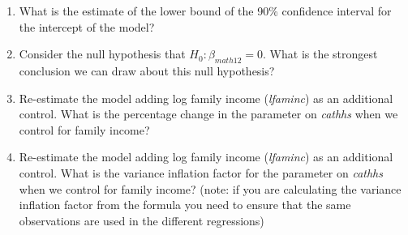 \begin{enumerate}
\item What is the estimate of the lower bound of the 90\% confidence interval for the intercept of the model?

\item Consider the null hypothesis that $H_0:\beta_{math12}=0$. What is the strongest conclusion we can draw about this null hypothesis?

\item Re-estimate the model adding log family income (\textit{lfaminc}) as an additional control. What is the percentage change in the parameter on \textit{cathhs} when we control for family income?

\item Re-estimate the model adding log family income (\textit{lfaminc}) as an additional control. What is the variance inflation factor for the parameter on \textit{cathhs} when we control for family income? (note: if you are calculating the variance inflation factor from the formula you need to ensure that the same observations are used in the different regressions)
\end{enumerate}

